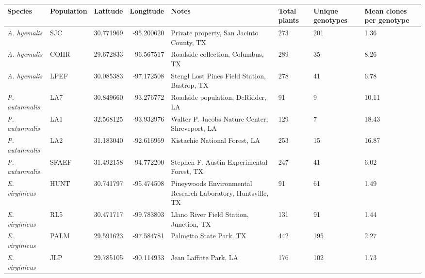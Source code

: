 \begin{tabular}{llrrp{}p{2cm}p{2cm}p{2cm}}
  \hline
Species & Population & Latitude & Longitude & Notes & Total plants & Unique genotypes & Mean clones per genotype \\ 
  \hline
\textit{A. hyemalis} & SJC & 30.771969 & -95.200620 & Private property, San Jacinto County, TX & 273 & 201 & 1.36 \\ 
  \textit{A. hyemalis} & COHR & 29.672833 & -96.567517 & Roadside collection, Columbus, TX & 289 & 35 & 8.26 \\ 
  \textit{A. hyemalis} & LPEF & 30.085383 & -97.172508 & Stengl Lost Pines Field Station, Bastrop, TX & 278 & 41 & 6.78 \\ 
  \textit{P. autumnalis} & LA7 & 30.849660 & -93.276772 & Roadside population, DeRidder, LA & 91 & 9 & 10.11 \\ 
  \textit{P. autumnalis} & LA1 & 32.568125 & -93.932976 & Walter P. Jacobs Nature Center, Shreveport, LA & 129 & 7 & 18.43 \\ 
  \textit{P. autumnalis} & LA2 & 31.183040 & -92.616969 & Kistachie National Forest, LA & 253 & 15 & 16.87 \\ 
  \textit{P. autumnalis} & SFAEF & 31.492158 & -94.772200 & Stephen F. Austin Experimental Forest, TX & 247 & 41 & 6.02 \\ 
  \textit{E. virginicus} & HUNT & 30.741797 & -95.474508 & Pineywoods Environmental Research Laboratory, Huntsville, TX & 91 & 61 & 1.49 \\ 
  \textit{E. virginicus} & RL5 & 30.471717 & -99.783803 & Llano River Field Station, Junction, TX & 131 & 91 & 1.44 \\ 
  \textit{E. virginicus} & PALM & 29.591623 & -97.584781 & Palmetto State Park, TX & 442 & 195 & 2.27 \\ 
  \textit{E. virginicus} & JLP & 29.785105 & -90.114933 & Jean Laffitte Park, LA & 176 & 102 & 1.73 \\ 
   \hline
\end{tabular}

